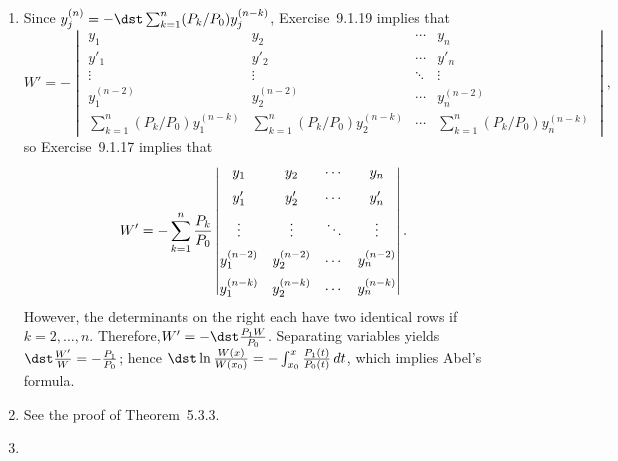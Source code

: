 \documentclass[openany]{book}
\newenvironment{sectionSolutions}{
 \begin{enumerate}[item-label={\thesection.\arabic{enumi}.}]
}{
 \end{enumerate}
}
\begin{document}
\begin{sectionSolutions}
\item
Since $y_j^{(n)}=-\dst\sum_{k=1}^n(P_k/P_0)y_j^{(n-k)}$,
Exercise~9.1.19 implies that
\[
W'=-
\begin{vmatrix}
y_1&y_2&\cdots&y_n\\
y'_1&y'_2&\cdots&y'_n\\
\vdots&\vdots&\ddots&\vdots\\
y_1^{(n-2)}&y_2^{(n-2)}&\cdots&y_n^{(n-2)}\\
\sum_{k=1}^n(P_k/P_0)y_1^{(n-k)}&
\sum_{k=1}^n(P_k/P_0)y_2^{(n-k)}&\cdots&
\sum_{k=1}^n(P_k/P_0)y_n^{(n-k)}
\end{vmatrix},
\]
so Exercise~9.1.17 implies that
\[
W'=-\sum_{k=1}^n\frac{P_k}{ P_0}
\begin{vmatrix}
y_1&y_2&\cdots&y_n\\[2\jot]
y'_1&y'_2&\cdots&y'_n\\[2\jot]
\vdots&\vdots&\ddots&\vdots\\[2\jot]
y_1^{(n-2)}&y_2^{(n-2)}&\cdots&y_n^{(n-2)}\\[2\jot]
y_1^{(n-k)}&
y_2^{(n-k)}&\cdots&
y_n^{(n-k)}
\end{vmatrix}.
\]
However, the determinants on the right each have two identical rows
if $k=2,\dots,n$. Therefore,$W'=-\dst\frac{P_1W}{ P_0}$.  Separating
variables yields $\dst\frac{W'}{ W}=-\frac{P_1}{ P_0}$; hence
$\dst\ln \frac{W(x)}{ W(x_0)}=-\int_{x_0}^x \frac{P_1(t)}{
P_0(t)}\,dt$, which implies Abel's formula.



\item
See the proof of Theorem~5.3.3.


\item
{}
\end{sectionSolutions}
\end{document}

